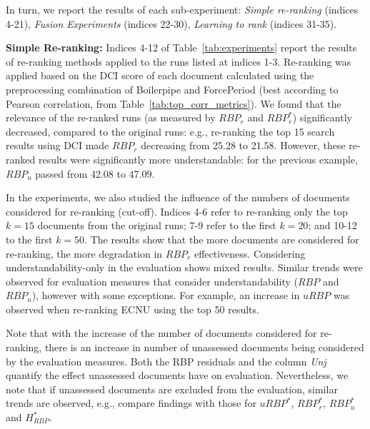 In turn, we report the results of each sub-experiment: \textit{Simple re-ranking} (indices 4-21), \textit{Fusion Experiments} (indices 22-30), \textit{Learning to rank} (indices 31-35).



\textbf{Simple Re-ranking:} Indices 4-12 of Table~\ref{tab:experiments} report the results of re-ranking methods applied to the runs listed at indices 1-3. Re-ranking was applied based on the DCI score of each document calculated using the preprocessing combination of Boilerpipe and ForcePeriod (best according to Pearson correlation, from Table~\ref{tab:top_corr_metrics}).
We found that the relevance of the re-ranked runs (as measured by $RBP_r$ and $RBP_r^*$) significantly decreased, compared to the original runs: e.g., re-ranking the top 15 search results using DCI  made $RBP_r$ decreasing from 25.28 to 21.58. However, these re-ranked results were significantly more understandable: for the previous example, $RBP_u$ passed from 42.08 to 47.09.

In the experiments, we also studied the influence of the numbers of documents considered for re-ranking (cut-off). Indices 4-6 refer to re-ranking only the top $k=15$ documents from the original runs; 7-9 refer to the first $k=20$; and 10-12 to the first $k=50$. The results show that the more documents are considered for re-ranking, the more degradation in $RBP_r$ effectiveness. Considering understandability-only in the evaluation shows mixed results. Similar trends were observed for evaluation measures that consider understandability ($RBP$ and $RBP_u$), however with some exceptions. For example, an increase in $uRBP$ was observed when re-ranking ECNU using the top 50 results. 

Note that with the increase of the number of documents considered for re-ranking, there is an increase in number of unassessed documents being considered by the evaluation measures. Both the RBP residuals and the column \textit{Unj} quantify the effect unassessed documents have on evaluation. Nevertheless, we note that if unassessed documents are excluded from the evaluation, similar trends are observed, e.g., compare findings with those for $uRBP^*$, $RBP_r^*$, $RBP_u^*$ and $H_{RBP}^*$.

